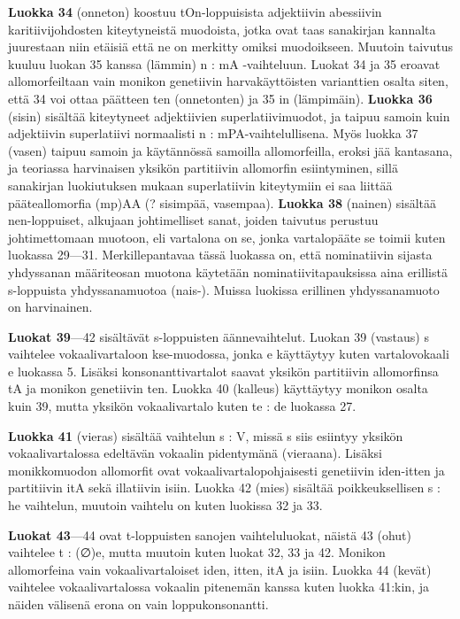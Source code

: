 \documentclass[free]{flammie}
\begin{document}
\textbf{Luokka 34} (onneton) koostuu tOn-loppuisista adjektiivin abessiivin karitiivijohdosten kiteytyneistä muodoista, jotka ovat taas sanakirjan kannalta juurestaan niin
etäisiä että ne on merkitty omiksi muodoikseen. Muutoin taivutus kuuluu luokan 35 kanssa (lämmin) n : mA -vaihteluun. Luokat 34 ja 35 eroavat allomorfeiltaan
vain monikon genetiivin harvakäyttöisten varianttien osalta siten, että 34 voi ottaa
päätteen ten (onnetonten) ja 35 in (lämpimäin).
\textbf{Luokka 36} (sisin) sisältää kiteytyneet adjektiivien superlatiivimuodot, ja taipuu
samoin kuin adjektiivin superlatiivi normaalisti n : mPA-vaihtelullisena. Myös
luokka 37 (vasen) taipuu samoin ja käytännössä samoilla allomorfeilla, eroksi
jää kantasana, ja teoriassa harvinaisen yksikön partitiivin allomorfin esiintyminen, sillä sanakirjan luokiutuksen mukaan superlatiivin kiteytymiin ei saa liittää
pääteallomorfia (mp)AA (? sisimpää, vasempaa).
\textbf{Luokka 38} (nainen) sisältää nen-loppuiset, alkujaan johtimelliset sanat, joiden
taivutus perustuu johtimettomaan muotoon, eli vartalona on se, jonka vartalopääte se toimii kuten luokassa 29—31. Merkillepantavaa tässä luokassa on, että nominatiivin sijasta yhdyssanan määriteosan muotona käytetään nominatiivitapauksissa aina erillistä s-loppuista yhdyssanamuotoa (nais-). Muissa luokissa erillinen
yhdyssanamuoto on harvinainen.

\textbf{Luokat 39}—42 sisältävät s-loppuisten äännevaihtelut. Luokan 39 (vastaus) s
vaihtelee vokaalivartaloon kse-muodossa, jonka e käyttäytyy kuten vartalovokaali e luokassa 5. Lisäksi konsonanttivartalot saavat yksikön partitiivin allomorfinsa
tA ja monikon genetiivin ten. Luokka 40 (kalleus) käyttäytyy monikon osalta kuin
39, mutta yksikön vokaalivartalo kuten te : de luokassa 27.

\textbf{Luokka 41} (vieras) sisältää vaihtelun s : V, missä s siis esiintyy yksikön vokaalivartalossa edeltävän vokaalin pidentymänä (vieraana). Lisäksi monikkomuodon
allomorfit ovat vokaalivartalopohjaisesti genetiivin iden-itten ja partitiivin itA sekä illatiivin isiin. Luokka 42 (mies) sisältää poikkeuksellisen s : he vaihtelun,
muutoin vaihtelu on kuten luokissa 32 ja 33.

\textbf{Luokat 43}—44 ovat t-loppuisten sanojen vaihteluluokat, näistä 43 (ohut) vaihtelee t : (∅)e, mutta muutoin kuten luokat 32, 33 ja 42. Monikon allomorfeina vain
vokaalivartaloiset iden, itten, itA ja isiin. Luokka 44 (kevät) vaihtelee vokaalivartalossa vokaalin pitenemän kanssa kuten luokka 41:kin, ja näiden välisenä erona on vain loppukonsonantti.
\end{document}
